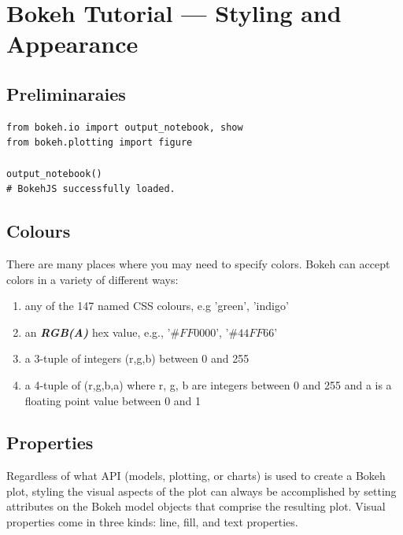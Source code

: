 \documentclass[a4paper,12pt]{article}
\begin{document}
	\large
	
\section*{Bokeh Tutorial — Styling and Appearance}

\subsection*{Preliminaraies}
\begin{framed}
\begin{verbatim}
from bokeh.io import output_notebook, show
from bokeh.plotting import figure

output_notebook()
# BokehJS successfully loaded.
\end{verbatim}
\end{framed}


\subsection{Colours}
There are many places where you may need to specify colors. Bokeh can accept colors in a variety of different ways:
\begin{enumerate}
\item any of the 147 named CSS colours, e.g 'green', 'indigo'
\item an \textit{\textbf{RGB(A)}} hex value, e.g., '$\#FF0000$', '$\#44FF66$'
\item a 3-tuple of integers (r,g,b) between 0 and 255
\item a 4-tuple of (r,g,b,a) where r, g, b are integers between 0 and 255 and a is a floating point value between 0 and 1
\end{enumerate}

\subsection{Properties}
Regardless of what API (models, plotting, or charts) is used to create a Bokeh plot, styling the visual aspects of the plot can always be accomplished by setting attributes on the Bokeh model objects that comprise the resulting plot. Visual properties come in three kinds: line, fill, and text properties. 
\end{document}
